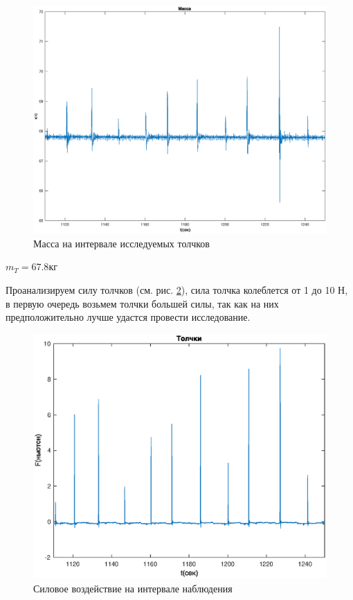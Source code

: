 \documentclass[a4paper,12pt, openany]{book}
\theoremstyle{plain} %
\theoremstyle{definition} %
\theoremstyle{remark} %
\numberwithin{equation}{chapter}
\begin{document}
{\begin{figure}[h!]
\begin{center}
\begin{minipage}[h]{0.49\linewidth}
            \includegraphics[width=1\linewidth]{mass_concrete.eps}
            \caption{Масса на интервале исследуемых толчков}
            \label{mass_short_time}
        \end{minipage}
    \end{center}
\end{figure}

$m_T=67.8$кг

Проанализируем силу толчков (см. рис. \ref{pushes_real}), сила толчка колеблется от 1 до 10 Н,
в первую очередь возьмем толчки большей силы, так как на них предположительно лучше удастся провести исследование.

\begin{figure}[h!]
    \centering
    \includegraphics[width=0.9\linewidth]{pushes_real.eps}
    \caption{Силовое воздействие на интервале наблюдения}
    \label{pushes_real}
\end{figure}

}
\end{document}
